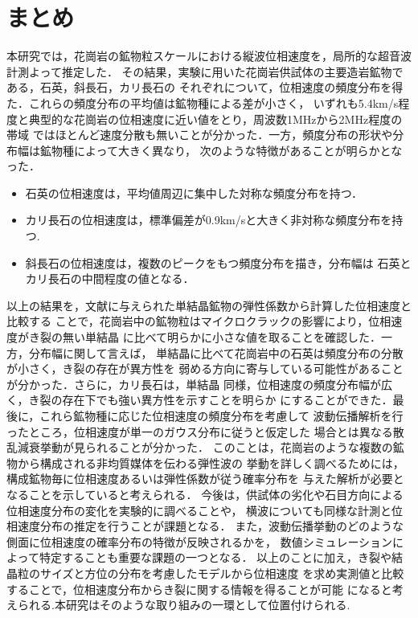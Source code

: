 \documentclass{jsce}
\begin{document}
\section{まとめ}
本研究では，花崗岩の鉱物粒スケールにおける縦波位相速度を，局所的な超音波計測よって推定した．
その結果，実験に用いた花崗岩供試体の主要造岩鉱物である，石英，斜長石，カリ長石の
それぞれについて，位相速度の頻度分布を得た．これらの頻度分布の平均値は鉱物種による差が小さく，
いずれも5.4km/s程度と典型的な花崗岩の位相速度に近い値をとり，周波数1MHzから2MHz程度の帯域
ではほとんど速度分散も無いことが分かった．一方，頻度分布の形状や分布幅は鉱物種によって大きく異なり，
次のような特徴があることが明らかとなった．
\begin{itemize}
\item
石英の位相速度は，平均値周辺に集中した対称な頻度分布を持つ．
\item
カリ長石の位相速度は，標準偏差が0.9km/sと大きく非対称な頻度分布を持つ. 
\item
斜長石の位相速度は，複数のピークをもつ頻度分布を描き，分布幅は
石英とカリ長石の中間程度の値となる．
\end{itemize}
以上の結果を，文献に与えられた単結晶鉱物の弾性係数から計算した位相速度と比較する
ことで，花崗岩中の鉱物粒はマイクロクラックの影響により，位相速度がき裂の無い単結晶
に比べて明らかに小さな値を取ることを確認した．一方，分布幅に関して言えば，
単結晶に比べて花崗岩中の石英は頻度分布の分散が小さく，き裂の存在が異方性を
弱める方向に寄与している可能性があることが分かった．さらに，カリ長石は，単結晶
同様，位相速度の頻度分布幅が広く，き裂の存在下でも強い異方性を示すことを明らか
にすることができた．最後に，これら鉱物種に応じた位相速度の頻度分布を考慮して
波動伝播解析を行ったところ，位相速度が単一のガウス分布に従うと仮定した
場合とは異なる散乱減衰挙動が見られることが分かった．
このことは，花崗岩のような複数の鉱物から構成される非均質媒体を伝わる弾性波の
挙動を詳しく調べるためには，構成鉱物毎に位相速度あるいは弾性係数が従う確率分布を
与えた解析が必要となることを示していると考えられる．
今後は，供試体の劣化や石目方向による位相速度分布の変化を実験的に調べることや，
横波についても同様な計測と位相速度分布の推定を行うことが課題となる．
また，波動伝播挙動のどのような側面に位相速度の確率分布の特徴が反映されるかを，
数値シミュレーションによって特定することも重要な課題の一つとなる．
以上のことに加え，き裂や結晶粒のサイズと方位の分布を考慮したモデルから位相速度
を求め実測値と比較することで，位相速度分布からき裂に関する情報を得ることが可能
になると考えられる.本研究はそのような取り組みの一環として位置付けられる.
\\
\end{document}
